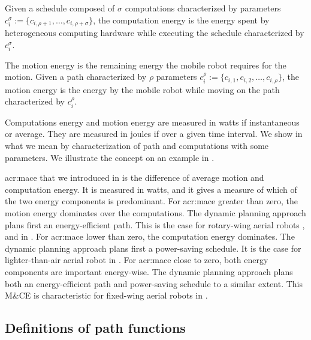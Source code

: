 \begin{highlight}
\begin{defn}
  Given a schedule composed of $\sigma$ computations characterized by parameters $c_i^\sigma:=\{c_{i,\rho+1},\dots,c_{i,\rho+\sigma}\}$, the computation energy is the energy spent by heterogeneous computing hardware while executing the schedule characterized by $c_i^\sigma$.
  
  The motion energy is the remaining energy the mobile robot requires for the motion. Given a path characterized by $\rho$ parameters $c_i^\rho:=\{c_{i,1},c_{i,2},\dots,c_{i,\rho}\}$, the motion energy is the energy by the mobile robot while moving on the path characterized by $c_i^\rho$.
\end{defn}
\end{highlight}

Computations energy and motion energy are measured in watts if instantaneous or average. They are measured in joules if over a given time interval. We show in  what we mean by characterization of path and computations with some parameters. We illustrate the concept on an example in . 

\Gls{acr:mace} that we introduced in  is the difference of average motion and computation energy. It is measured in watts, and it gives a measure of which of the two energy components is predominant. For \Gls{acr:mace} greater than zero, the motion energy dominates over the computations. The dynamic planning approach plans first an energy-efficient path. This is the case for rotary-wing aerial robots , and  in . For \Gls{acr:mace} lower than zero, the computation energy dominates. The dynamic planning approach plans first a power-saving schedule. It is the case for lighter-than-air aerial robot  in . For \Gls{acr:mace} close to zero, both energy components are important energy-wise. The dynamic planning approach plans both an energy-efficient path and power-saving schedule to a similar extent. This M\&CE is characteristic for fixed-wing aerial robots  in .

\subsection{Definitions of path functions}

